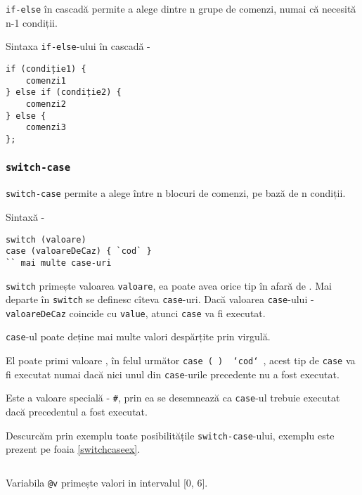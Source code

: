\texttt{if-else} în cascadă permite a alege dintre n grupe de comenzi, numai că necesită n-1 condiții.

Sintaxa \texttt{if-else}-ului în cascadă -
\begin{verbatim}
if (condiție1) {
	comenzi1
} else if (condiție2) {
	comenzi2
} else {
	comenzi3
};
\end{verbatim}

\subsubsection{\texttt{switch-case}}

\texttt{switch-case} permite a alege între n blocuri de comenzi, pe bază de n condiții.

Sintaxă -
\begin{verbatim}
switch (valoare)
case (valoareDeCaz) { `cod` }
`` mai multe case-uri
\end{verbatim}

\texttt{switch} primește valoarea \texttt{valoare}, ea poate avea orice tip în afară de \bool. Mai departe în \texttt{switch} se definesc cîteva \texttt{case}-uri. Dacă valoarea \texttt{case}-ului - \texttt{valoareDeCaz} coincide cu \texttt{value}, atunci \texttt{case} va fi executat.

\texttt{case}-ul poate deține mai multe valori despărțite prin virgulă.

El poate primi valoare \void, în felul următor \texttt{case (~) { `cod` }}, acest tip de \texttt{case} va fi executat numai dacă nici unul din \texttt{case}-urile precedente nu a fost executat.

Este a valoare specială - \texttt{#}, prin ea se desemnează ca \texttt{case}-ul trebuie executat dacă precedentul a fost executat.

Descurcăm prin exemplu toate posibilitățile \texttt{switch-case}-ului, exemplu este prezent pe foaia \ref{switchcaseex}.

\begin{sourcecode}
    \label{switchcaseex}
    \inputminted[linenos]{icl}{../sources/switchcaseex.icL}
\end{sourcecode}

Variabila \texttt{@v} primește valori in intervalul [0, 6].

